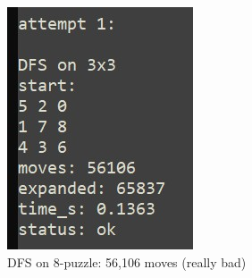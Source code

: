 \documentclass[letterpaper]{article}
\begin{document}
\begin{figure}[h]
\centering
\includegraphics[width=0.85\columnwidth]{dfs_3x3.jpg}
\caption{DFS on 8-puzzle: 56,106 moves (really bad)}
\end{figure}
\end{document}
